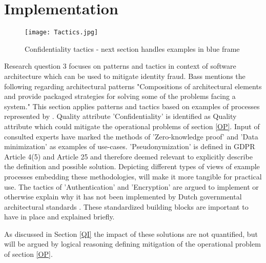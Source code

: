 \chapter{Implementation}\label{s:Implementation}

\graphicspath{ {./images/} }
    \begin{figure}
        \centering
        \texttt{[image: Tactics.jpg]}\\
        \caption{Confidentiality tactics - next section handles examples in blue frame}
        \label{fig:Tactics}
    \end{figure}

Research question 3 focuses on patterns and tactics in context of software architecture which can be used to mitigate identity fraud. Bass \etal \cite{Bass2015SoftwareAI} mentions the following regarding architectural patterns "Compositions of architectural elements and provide packaged strategies for solving some of the problems facing a system." This section applies patterns and tactics based on examples of processes represented by . Quality attribute 'Confidentiality' is identified as Quality attribute which could mitigate the operational problems of section \ref{OP}. Input of consulted experts have marked the methods of 'Zero-knowledge proof' and 'Data minimization' as examples of use-cases. 'Pseudonymization' is defined in GDPR Article 4(5) and Article 25 \cite{GDPR} and therefore deemed relevant to explicitly describe the definition and possible solution. Depicting different types of views of example processes embedding these methodologies, will make it more tangible for practical use. The tactics of 'Authentication' and 'Encryption' are argued to implement or otherwise explain why it has not been implemented by Dutch governmental architectural standards \cite{NORA_PasToeOfLegUit}. These standardized building blocks are important to have in place and explained briefly. 

As discussed in Section \ref{QI} the impact of these solutions are not quantified, but will be argued by logical reasoning defining mitigation of the operational problem of section \ref{OP}.


